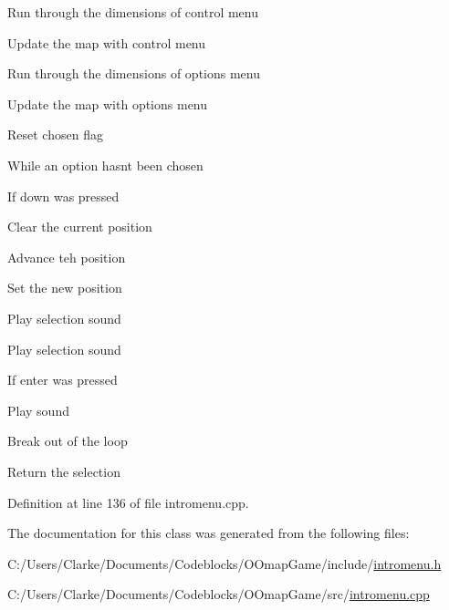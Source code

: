 Run through the dimensions of control menu

Update the map with control menu

Run through the dimensions of options menu

Update the map with options menu

Reset chosen flag

While an option hasnt been chosen

If down was pressed

Clear the current position

Advance teh position

Set the new position

Play selection sound

Play selection sound

If enter was pressed

Play sound

Break out of the loop

Return the selection 

Definition at line 136 of file intromenu.\-cpp.



The documentation for this class was generated from the following files\-:\begin{DoxyCompactItemize}
\item 
C\-:/\-Users/\-Clarke/\-Documents/\-Codeblocks/\-O\-Omap\-Game/include/\hyperlink{intromenu_8h}{intromenu.\-h}\item 
C\-:/\-Users/\-Clarke/\-Documents/\-Codeblocks/\-O\-Omap\-Game/src/\hyperlink{intromenu_8cpp}{intromenu.\-cpp}\end{DoxyCompactItemize}

